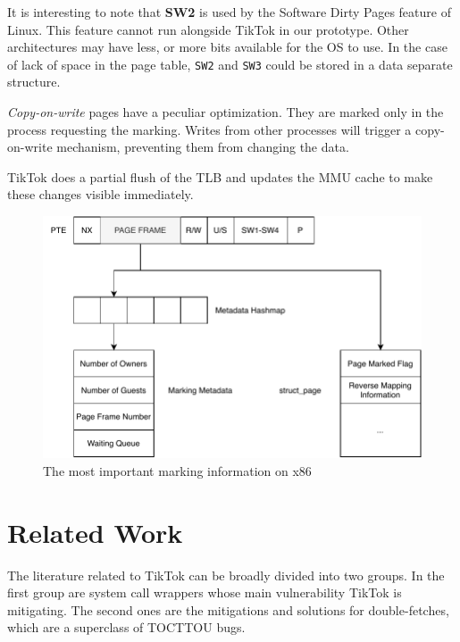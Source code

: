 It is interesting to note that \textbf{SW2} is used by the Software Dirty Pages
feature of Linux. This feature cannot run alongside TikTok in our prototype.
Other architectures may have less, or more bits available for the OS to use. In
the case of lack of space in the page table, \texttt{SW2} and \texttt{SW3} could
be stored in a data separate structure.

\emph{Copy-on-write} pages have a peculiar optimization. They are marked only in
the process requesting the marking. Writes from other processes will trigger a
copy-on-write mechanism, preventing them from changing the data.

TikTok does a partial flush of the TLB and updates the MMU cache to make these
changes visible immediately.

\begin{figure}[]
  \centering
  \includegraphics[width=\linewidth]{img/book-keeping.pdf}
  \caption{The most important marking information on x86}
  \label{fig:bookkeeping}
\end{figure}


\section{Related Work}
\label{sec:relatedwork}

The literature related to TikTok can be broadly divided into two groups. In the
first group are system call wrappers whose main vulnerability TikTok is
mitigating. The second ones are the mitigations and solutions for
double-fetches, which are a superclass of TOCTTOU bugs.

